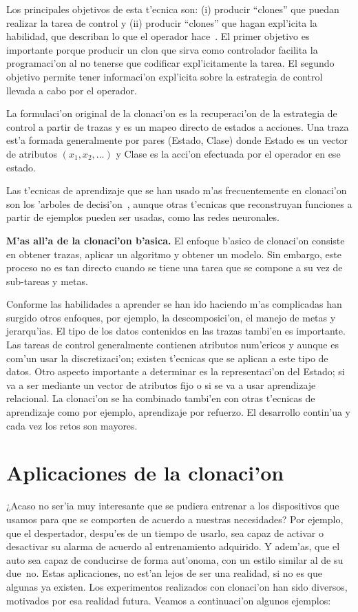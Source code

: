 \documentclass[11pt]{article}
\begin{document}
Los principales objetivos de esta t'ecnica son: (i) producir ``clones'' que puedan realizar la tarea de control y (ii) producir ``clones'' que hagan expl'icita la habilidad, que describan lo que el operador hace~\cite{modellingskills}. El primer objetivo es importante porque producir un clon que sirva como controlador facilita la programaci'on al no tenerse que codificar expl'icitamente la tarea. El segundo objetivo permite tener informaci'on expl'icita sobre la estrategia de control llevada a cabo por el operador. 

La formulaci'on original de la \textsf{clonaci'on} es la recuperaci'on de la estrategia de control a partir de trazas y es un mapeo directo de estados a acciones. Una traza est'a formada generalmente por pares (Estado, Clase) donde Estado es un vector de atributos $(x_1,x_2,...)$ y Clase es la acci'on efectuada por el operador en ese estado. 

Las t'ecnicas de aprendizaje que se han usado m'as frecuentemente en \textsf{clonaci'on} son los \textsf{'arboles de decisi'on}~\cite{quinlan1986}, aunque otras t'ecnicas que reconstruyan funciones a partir de ejemplos pueden ser usadas, como las redes neuronales.

\medskip
\noindent

\textbf{M'as all'a de la clonaci'on b'asica.}
El enfoque b'asico de clonaci'on consiste en obtener trazas, aplicar un algoritmo y obtener un modelo. Sin embargo, este proceso no es tan directo cuando se tiene una tarea que se compone a su vez de sub-tareas y metas.

Conforme las habilidades a aprender se han ido haciendo m'as complicadas han surgido otros enfoques, por ejemplo, la descomposici'on, el manejo de metas y jerarqu'ias. El tipo de los datos contenidos en las trazas tambi'en es importante. Las tareas de control generalmente contienen atributos num'ericos y aunque es com'un usar la discretizaci'on; existen t'ecnicas que se aplican a este tipo de datos. Otro aspecto importante a determinar es la representaci'on del Estado; si va a ser mediante un vector de atributos fijo o si se va a usar aprendizaje relacional. La clonaci'on se ha combinado tambi'en con otras t'ecnicas de aprendizaje como por ejemplo, aprendizaje por refuerzo. El desarrollo contin'ua y cada vez los retos son mayores.


\section{Aplicaciones de la clonaci'on}
\textquestiondown ¿Acaso no ser'ia muy interesante que se pudiera entrenar a los dispositivos que usamos para que se comporten de acuerdo a nuestras necesidades? Por ejemplo, que el despertador, despu'es de un tiempo de usarlo, sea capaz de activar o desactivar su alarma de acuerdo al entrenamiento adquirido. Y adem'as, que el auto sea capaz de conducirse de forma aut'onoma, con un estilo similar al de su due~no. Estas aplicaciones, no est'an lejos de ser una realidad, si no es que algunas ya existen. Los experimentos realizados con clonaci'on han sido diversos, motivados por esa realidad futura. Veamos a continuaci'on algunos ejemplos:
\medskip
\noindent
\end{document}
